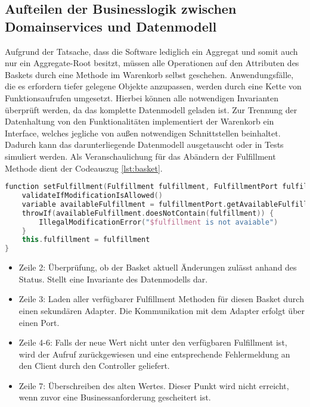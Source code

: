 \subsection{Aufteilen der Businesslogik zwischen Domainservices und Datenmodell}

Aufgrund der Tatsache, dass die Software lediglich ein Aggregat und somit auch nur ein Aggregate-Root besitzt, müssen alle Operationen auf den Attributen des Baskets durch eine Methode im Warenkorb selbst geschehen. Anwendungsfälle, die es erfordern tiefer gelegene Objekte anzupassen, werden durch eine Kette von Funktionsaufrufen umgesetzt. Hierbei können alle notwendigen Invarianten überprüft werden, da das komplette Datenmodell geladen ist. Zur Trennung der Datenhaltung von den Funktionalitäten implementiert der Warenkorb ein Interface, welches jegliche von außen notwendigen Schnittstellen beinhaltet. Dadurch kann das darunterliegende Datenmodell ausgetauscht oder in Tests simuliert werden. Als Veranschaulichung für das Abändern der Fulfillment Methode dient der Codeauszug \ref{lst:basket}.

\begin{minipage}{\linewidth} %
	\begin{lstlisting}[caption={Setzen der Fulfillment Methode im Basket Aggregate}, label={lst:basket}, language=Kotlin]
function setFulfillment(Fulfillment fulfillment, FulfillmentPort fulfillmentPort) {
	validateIfModificationIsAllowed()
	variable availableFulfillment = fulfillmentPort.getAvailableFulfillment(outletId)
	throwIf(availableFulfillment.doesNotContain(fulfillment)) {
		IllegalModificationError("$fulfillment is not avaiable")
	}
	this.fulfillment = fulfillment
}
	\end{lstlisting}
\end{minipage}

\begin{itemize}[noitemsep,nolistsep]
	\item Zeile 2: Überprüfung, ob der Basket aktuell Änderungen zulässt anhand des Status. Stellt eine Invariante des Datenmodells dar.
	\item Zeile 3: Laden aller verfügbarer Fulfillment Methoden für diesen Basket durch einen sekundären Adapter. Die Kommunikation mit dem Adapter erfolgt über einen Port.
	\item Zeile 4-6: Falls der neue Wert nicht unter den verfügbaren Fulfillment ist, wird der Aufruf zurückgewiesen und eine entsprechende Fehlermeldung an den Client durch den Controller geliefert.
	\item Zeile 7: Überschreiben des alten Wertes. Dieser Punkt wird nicht erreicht, wenn zuvor eine Businessanforderung gescheitert ist.
\end{itemize}

